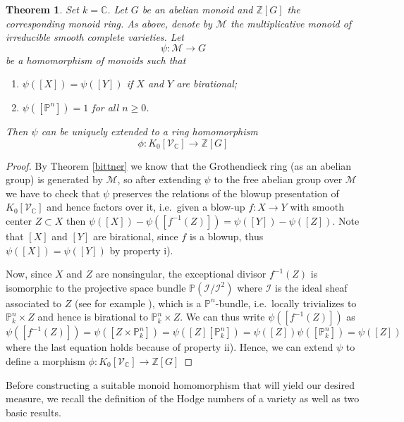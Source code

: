 \documentclass[11pt, a4paper, german, twoside]{article}
\theoremstyle{plain}
\newtheorem{theorem}{Theorem}[section]
\theoremstyle{definition}
\newcommand{\gring}[1][k]{K_0[\mathcal{V}_#1]}
\begin{document}
\begin{theorem}
    \label{th1}
    Set $k = \mathbb{C}$. Let $G$ be an abelian monoid and $\mathbb{Z}[G]$ the corresponding monoid ring. As above, denote
    by $\mathcal{M}$ the multiplicative monoid of irreducible smooth complete varieties. Let
    \[
        \psi \colon \mathcal{M} \to G
    \]
    be a homomorphism of monoids such that
    \begin{enumerate}[label=\rm{\roman*)}]
        \item $\psi([X]) = \psi([Y])$ if $X$ and $Y$ are birational;
        \item $\psi([\mathbb{P}^n]) = 1$ for all $n \ge 0$.
    \end{enumerate}
    Then $\psi$ can be uniquely extended to a ring homomorphism 
    \[
        \phi \colon \gring[\mathbb{C}] \to \mathbb{Z} [G]
    \]
\end{theorem}
\begin{proof}
    By Theorem \ref{bittner} we know that the Grothendieck ring (as an abelian group) is generated by $\mathcal{M}$, so after extending $\psi$ to
    the free abelian group over $\mathcal{M}$ 
    we have to check that $\psi$ preserves the relations of the blowup presentation of $\gring[\mathbb{C}]$ and hence factors over it,
    i.e.\ given a blow-up $f \colon X \to Y$ with smooth center $Z \subset X$ then $\psi([X]) - \psi([f^{-1}(Z)]) = \psi([Y]) - \psi([Z])$. 
    Note that $[X]$ and $[Y]$ are birational, since $f$ is a blowup, thus $\psi([X]) = \psi([Y])$ by property i).
    
    Now, since $X$ and $Z$ are nonsingular, the exceptional divisor $f^{-1}(Z)$ is isomorphic to 
    the projective space bundle  $\mathbb{P}(\mathcal{I}/\mathcal{I}^2)$ 
    where $\mathcal{I}$ is the ideal sheaf associated to $Z$ (see for example \cite[II.8, Thm 8.24]{Ha}),
    which is a $\mathbb{P}^n$-bundle, i.e.\ locally trivializes to $\mathbb{P}_k^n \times Z$
    and hence is birational to $\mathbb{P}_k^n \times Z$. 
    We can thus write $\psi([f^{-1}(Z)])$ as  
    \[
        \psi([f^{-1}(Z)]) = \psi([Z \times \mathbb{P}_k^n]) = \psi([Z][\mathbb{P}_k^n]) = \psi([Z])\psi([\mathbb{P}_k^n]) = \psi([Z])
    \]
    where the last equation holds because of property ii).
    Hence, we can extend $\psi$ to define a morphism $\phi \colon \gring[\mathbb{C}] \to \mathbb{Z} [G]$
\end{proof}

Before constructing a suitable monoid homomorphism that will yield our desired measure, we recall the definition of the Hodge numbers
of a variety as well as two basic results.
\end{document}
